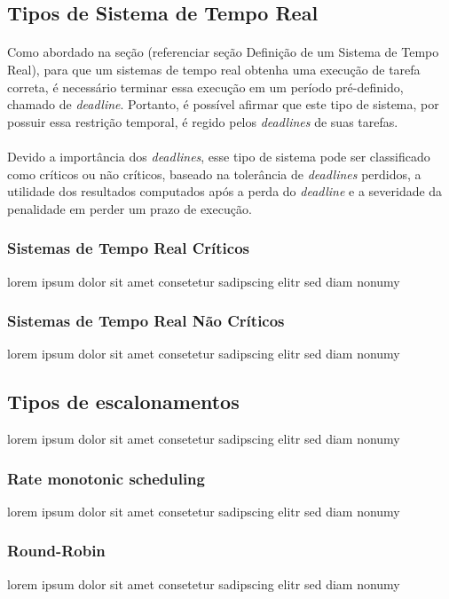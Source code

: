 \subsection{Tipos de Sistema de Tempo Real}
\paragraph{}
Como abordado na seção (referenciar seção Definição de um Sistema de Tempo Real),
para que um sistemas de tempo real obtenha uma execução de tarefa correta,
é necessário terminar essa execução em um período pré-definido, chamado de \textit{deadline}.
Portanto, é possível afirmar que este tipo de sistema, por possuir essa restrição temporal,
é regido pelos \textit{deadlines} de suas tarefas.
\paragraph{}
Devido a importância dos \textit{deadlines}, esse tipo de sistema pode ser classificado como
críticos ou não críticos, baseado na tolerância de \textit{deadlines} perdidos, a utilidade
dos resultados computados após a perda do \textit{deadline} e a severidade da penalidade em
perder um prazo de execução.

\subsubsection{Sistemas de Tempo Real Críticos}
lorem ipsum dolor sit amet consetetur sadipscing elitr sed diam nonumy

\subsubsection{Sistemas de Tempo Real Não Críticos}
lorem ipsum dolor sit amet consetetur sadipscing elitr sed diam nonumy


\subsection{Tipos de escalonamentos}
lorem ipsum dolor sit amet consetetur sadipscing elitr sed diam nonumy

\subsubsection{Rate monotonic scheduling}
lorem ipsum dolor sit amet consetetur sadipscing elitr sed diam nonumy

\subsubsection{Round-Robin}
lorem ipsum dolor sit amet consetetur sadipscing elitr sed diam nonumy

